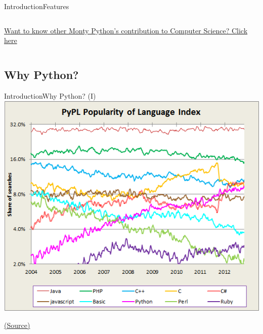 \documentclass[10pt,compress]{beamer} %
\begin{document}
\begin{frame}{Introduction}{Features}
\begin{columns}
		\tiny{\href{https://www.youtube.com/watch?v=anwy2MPT5RE}{Want to know other Monty Python's contribution to Computer Science? Click here}}
	   \end{columns}
\end{frame}


\subsection{Why Python?}
\begin{frame}[plain]{Introduction}{Why Python? (I)}
		\centering \includegraphics[width=0.8\linewidth]{figs/chart.png}\\
		\begin{center}
			\tiny{\href{http://rz.scale-it.pl/2013/01/07/python___language_of_the_decade.html}{(Source)}}
		\end{center}
\end{frame}
\end{document}
